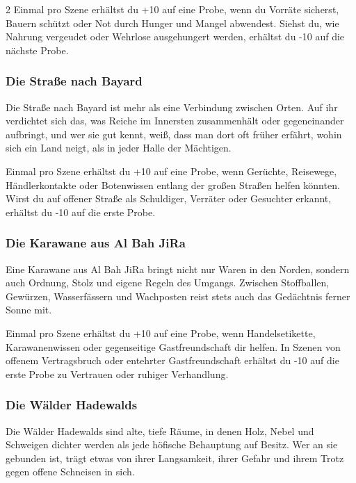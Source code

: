 {\begin{multicols*}{2}
        \bindungspielwertebox
        {Einmal pro Szene erhältst du +10 auf eine Probe, wenn du Vorräte sicherst, Bauern schützt oder Not durch Hunger und Mangel abwendest.}
        {Siehst du, wie Nahrung vergeudet oder Wehrlose ausgehungert werden, erhältst du -10 auf die nächste Probe.}

        \subsubsection*{Die Straße nach Bayard}
        Die Straße nach Bayard ist mehr als eine Verbindung zwischen Orten. Auf ihr verdichtet sich das, was Reiche im Innersten zusammenhält oder gegeneinander aufbringt, und wer sie gut kennt, weiß, dass man dort oft früher erfährt, wohin sich ein Land neigt, als in jeder Halle der Mächtigen.

        \bindungspielwertebox
        {Einmal pro Szene erhältst du +10 auf eine Probe, wenn Gerüchte, Reisewege, Händlerkontakte oder Botenwissen entlang der großen Straßen helfen könnten.}
        {Wirst du auf offener Straße als Schuldiger, Verräter oder Gesuchter erkannt, erhältst du -10 auf die erste Probe.}

        \subsubsection*{Die Karawane aus Al Bah JiRa}
        Eine Karawane aus Al Bah JiRa bringt nicht nur Waren in den Norden, sondern auch Ordnung, Stolz und eigene Regeln des Umgangs. Zwischen Stoffballen, Gewürzen, Wasserfässern und Wachposten reist stets auch das Gedächtnis ferner Sonne mit.

        \bindungspielwertebox
        {Einmal pro Szene erhältst du +10 auf eine Probe, wenn Handelsetikette, Karawanenwissen oder gegenseitige Gastfreundschaft dir helfen.}
        {In Szenen von offenem Vertragsbruch oder entehrter Gastfreundschaft erhältst du -10 auf die erste Probe zu Vertrauen oder ruhiger Verhandlung.}

        \subsubsection*{Die Wälder Hadewalds}
        Die Wälder Hadewalds sind alte, tiefe Räume, in denen Holz, Nebel und Schweigen dichter werden als jede höfische Behauptung auf Besitz. Wer an sie gebunden ist, trägt etwas von ihrer Langsamkeit, ihrer Gefahr und ihrem Trotz gegen offene Schneisen in sich.


\end{multicols*}}
